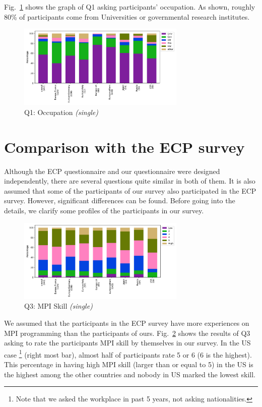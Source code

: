 \documentclass[conference,10pt,letterpaper]{IEEEtran}
\begin{document}
%
%
Fig.~\ref{fig:occupation} shows the graph of Q1 asking participants'
occupation. As shown, roughly 80\% of participants come from
Universities or governmental research institutes.
%
\begin{figure}[htb]
\begin{center}
\includegraphics[width=8cm]{Figs/Q1.pdf}
\caption{Q1: Occupation {\it(single)}}
\label{fig:occupation}
\end{center}
\end{figure}

\section{Comparison with the ECP survey}

Although the ECP questionnaire and our questionnaire were designed
independently, there are several questions quite similar in both of
them. It is also assumed that some of the participants of our survey
also participated in the ECP survey. However, significant differences
can be found. Before going into the details, we clarify some profiles
of the participants in our survey.

\begin{figure}[htb]
\begin{center}
\includegraphics[width=8cm]{Figs/Q3.pdf}
\caption{Q3: MPI Skill {\it(single)}}
\label{fig:mpi-skill}
\end{center}
\end{figure}

We assumed that the participants in the ECP survey have more
experiences on MPI
programming than the participants of ours. Fig.~\ref{fig:mpi-skill} 
shows the results of Q3 asking to rate the participants MPI skill by
themselves in our survey.  In the US case%
\footnote{Note that we asked
  the workplace in past 5 years, not asking nationalities.}
(right most bar), almost half of participants rate 5 or 6
(6 is the highest). This percentage in having high MPI skill (larger
than or equal to 5) in the US is the highest among the other
countries and nobody in US marked the lowest skill.
\end{document}
